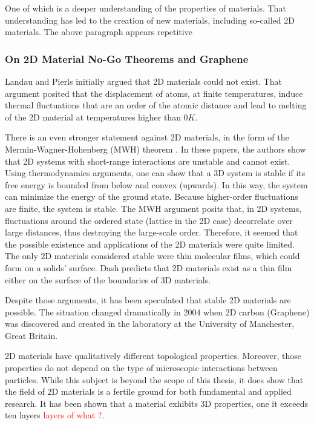   One of which is a deeper understanding of the properties of materials. That understanding has led to the creation of new materials, including so-called 2D materials.
\textcolor{}{ The above paragraph appears repetitive}

\subsubsection{On 2D Material No-Go Theorems and
Graphene}
Landau and Pierls\cite{LandauG}\cite{Pierls} initially argued that 2D materials could not exist. That argument posited that the displacement of atoms, at finite temperatures, induce thermal fluctuations that are an order of the atomic distance\cite{LandauG, Pierls} and lead to melting of the 2D material at temperatures higher than $ 0 K $. 

There is an even stronger statement against 2D materials, in the form of the Mermin-Wagner-Hohenberg (MWH) theorem \cite{Hohenberg}\cite{Mermin2}. In these papers, the authors show that 2D systems with short-range interactions are unstable and cannot exist.  Using thermodynamics arguments, one can show that a 3D system is stable if its free energy is bounded from below and convex (upwards). In this way, the system can minimize the energy of the ground state. Because higher-order fluctuations are finite, the system is stable.
The MWH argument posits that, in 2D systems, fluctuations around the ordered state (lattice in the 2D case) decorrelate over large distances, thus destroying the large-scale order. 
Therefore, it seemed that the possible existence and applications of the 2D materials were quite limited. The only 2D materials considered stable were thin molecular films, which could form on a solids' surface. Dash\cite{2DMatter1} predicts that 2D materials exist as a thin film either on the surface of the boundaries of 3D materials.

Despite those arguments, it has been speculated that stable 2D materials are possible\cite{2DMatter1}. The situation changed dramatically in 2004 when 2D carbon (Graphene) was discovered and created in the laboratory\cite{Graphene0, GrapheneN} at the University of Manchester, Great Britain. 

2D materials have qualitatively different topological properties\cite{2DMatterCurvature}. Moreover, those properties do not depend on the type of microscopic interactions between particles. While this subject is beyond the scope of this thesis, it does show that the field of 2D materials is a fertile ground for both fundamental and applied research. It has been shown \cite{GraphLayers} that a material exhibits 3D properties, one it exceeds ten layers \textcolor{red}{layers of what ?}.

